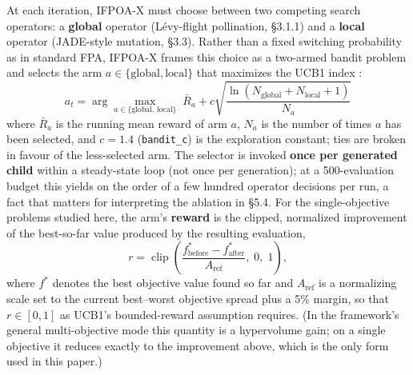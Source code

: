 \documentclass[preprint,12pt]{elsarticle}
\begin{document}
At each iteration, IFPOA-X must choose between two competing search operators: a \textbf{global} operator (L\'evy-flight pollination, \S3.1.1) and a \textbf{local} operator (JADE-style mutation, \S3.3). Rather than a fixed switching probability as in standard FPA, IFPOA-X frames this choice as a two-armed bandit problem and selects the arm $a \in \{\text{global}, \text{local}\}$ that maximizes the UCB1 index \cite{auer2002finite}:
\begin{equation}
a_t = \arg\max_{a \in \{\text{global},\,\text{local}\}} \; \bar{R}_a + c \sqrt{\frac{\ln(N_{\text{global}}+N_{\text{local}}+1)}{N_a}}
\label{eq:ucb1}
\end{equation}
where $\bar{R}_a$ is the running mean reward of arm $a$, $N_a$ is the number of times $a$ has been selected, and $c = 1.4$ (\texttt{bandit\_c}) is the exploration constant; ties are broken in favour of the less-selected arm. The selector is invoked \textbf{once per generated child} within a steady-state loop (not once per generation); at a 500-evaluation budget this yields on the order of a few hundred operator decisions per run, a fact that matters for interpreting the ablation in \S5.4. For the single-objective problems studied here, the arm's \textbf{reward} is the clipped, normalized improvement of the best-so-far value produced by the resulting evaluation,
\begin{equation}
r = \operatorname{clip}\!\left(\frac{f^{\ast}_{\text{before}} - f^{\ast}_{\text{after}}}{A_{\text{ref}}},\; 0,\; 1\right),
\label{eq:reward}
\end{equation}
where $f^{\ast}$ denotes the best objective value found so far and $A_{\text{ref}}$ is a normalizing scale set to the current best--worst objective spread plus a 5\% margin, so that $r \in [0,1]$ as UCB1's bounded-reward assumption requires. (In the framework's general multi-objective mode this quantity is a hypervolume gain; on a single objective it reduces exactly to the improvement above, which is the only form used in this paper.)
\end{document}
